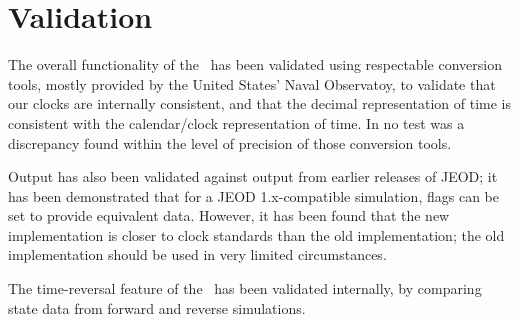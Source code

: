 %
%
% 
%

\section{Validation}


The overall functionality of the \timeDesc\ has been validated using 
respectable conversion tools, mostly
provided by the United States' Naval Observatoy, to validate that our clocks are
internally consistent, and that the decimal representation of time is consistent
with the calendar/clock representation of time.  In no test was a discrepancy
found within the level of precision of those conversion tools.

Output has also been validated against output from earlier releases of JEOD; it
has been demonstrated that for a JEOD 1.x-compatible simulation, flags can be 
set
to provide equivalent data.  However, it has been found that the new 
implementation 
is closer to clock standards than the old implementation; the old implementation
should be used in very limited circumstances.

The time-reversal feature of the \timeDesc\ has been validated internally, by 
comparing state data from forward and reverse simulations.

